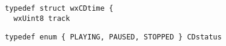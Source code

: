 %
%


\section{}\label{wxcdaudio}




{\small \begin{verbatim}
typedef struct wxCDtime {
  wxUint8 track
\end{verbatim}}
{\small \begin{verbatim}
typedef enum { PLAYING, PAUSED, STOPPED } CDstatus
\end{verbatim}}

